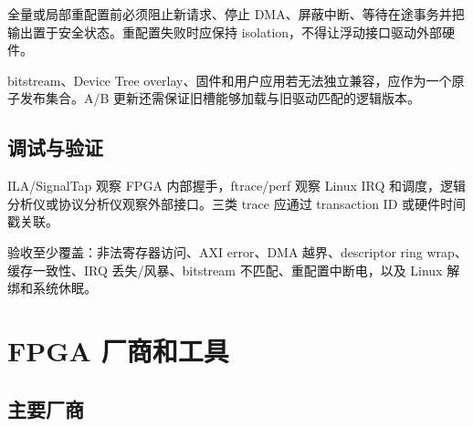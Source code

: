 全量或局部重配置前必须阻止新请求、停止 DMA、屏蔽中断、等待在途事务并把输出置于安全状态。重配置失败时应保持 isolation，不得让浮动接口驱动外部硬件。

bitstream、Device Tree overlay、固件和用户应用若无法独立兼容，应作为一个原子发布集合。A/B 更新还需保证旧槽能够加载与旧驱动匹配的逻辑版本。

\subsection{调试与验证}

ILA/SignalTap 观察 FPGA 内部握手，ftrace/perf 观察 Linux IRQ 和调度，逻辑分析仪或协议分析仪观察外部接口。三类 trace 应通过 transaction ID 或硬件时间戳关联。

验收至少覆盖：非法寄存器访问、AXI error、DMA 越界、descriptor ring wrap、缓存一致性、IRQ 丢失/风暴、bitstream 不匹配、重配置中断电，以及 Linux 解绑和系统休眠。

\section{FPGA 厂商和工具}

\subsection{主要厂商}

